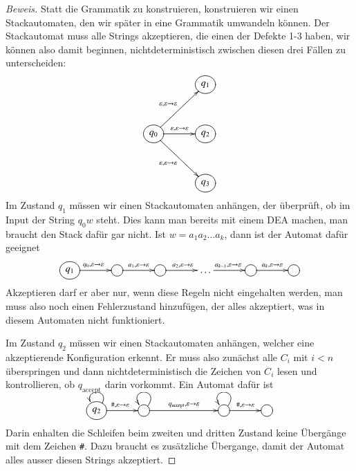 \begin{proof}[Beweis]
Statt die Grammatik zu konstruieren, konstruieren wir einen Stackautomaten,
den wir später in eine Grammatik umwandeln können.
Der Stackautomat
muss alle Strings akzeptieren, die einen der Defekte 1-3 haben, wir
können also damit beginnen, nichtdeterministisch zwischen diesen drei
Fällen zu unterscheiden:
\[
\entrymodifiers={++[o][F]}
\xymatrix @+3mm{
*+\txt{}
	&q_1
\\
q_0	\ar[ur]^{\varepsilon,\varepsilon\to\varepsilon}
	\ar[r]^{\varepsilon,\varepsilon\to\varepsilon}
	\ar[dr]_{\varepsilon,\varepsilon\to\varepsilon}
	&q_2
\\
*+\txt{}
	&q_3
}
\]
Im Zustand $q_1$ müssen wir einen Stackautomaten anhängen, der
überprüft, ob im Input der String $q_0w$ steht.
Dies kann man 
bereits mit einem DEA machen, man braucht den Stack dafür gar nicht.
Ist $w=a_1a_2\dots a_k$, dann ist der Automat dafür geeignet
\[
\xymatrix @+3mm{
*++[o][F]{q_1}\ar[r]^{q_0,\varepsilon\to\varepsilon}
	&*++[o][F]{}\ar[r]^{a_1,\varepsilon\to\varepsilon}
		&*++[o][F]{}\ar[r]^{a_2,\varepsilon\to\varepsilon}
			&\dots\ar[r]^{a_{k-1},\varepsilon\to\varepsilon}
				&*++[o][F]{}\ar[r]^{a_k,\varepsilon\to\varepsilon}
					&*++[o][F]{}
}
\]
Akzeptieren darf er aber nur, wenn diese Regeln nicht eingehalten
werden, man muss also noch einen Fehlerzustand hinzufügen, der
alles akzeptiert, was in diesem Automaten nicht funktioniert.

Im Zustand $q_2$ müssen wir einen Stackautomaten anhängen, welcher
eine akzeptierende Konfiguration erkennt.
Er muss also zunächst 
alle $C_i$ mit $i<n$ überspringen und dann nichtdeterministisch
die Zeichen von $C_i$ lesen und kontrollieren, ob $q_{\text{accept}}$
darin vorkommt.
Ein Automat dafür ist 
\[
\entrymodifiers={++[o][F]}
\xymatrix @+3mm{
q_2\ar@(ur,ul)
	\ar[r]^{{\tt\#},\varepsilon\to\varepsilon}
	&{}\ar@(ur,ul)
		\ar[rr]^{q_{\text{accept}},\varepsilon\to\varepsilon}
		&*+\txt{}
			&{}\ar@(ur,ul)
				\ar[r]^{{\tt\#},\varepsilon\to\varepsilon}
				&*++[o][F]{}
}
\]
Darin enhalten die Schleifen beim zweiten und dritten Zustand keine
Übergänge mit dem Zeichen {\tt\#}.
Dazu braucht es zusätzliche
Übergange, damit der Automat alles ausser diesen Strings akzeptiert.


\end{proof}
